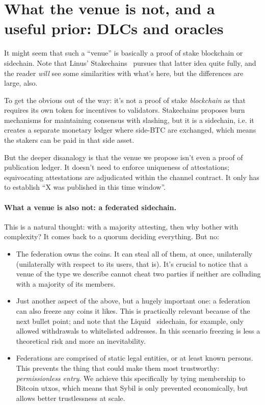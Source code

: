 \documentclass[11pt]{article}
\begin{document}
\section{What the venue is not, and a useful prior: DLCs and oracles}
\label{sec:venue}

It might seem that such a ``venue'' is basically a proof of stake blockchain or sidechain. Note that Linus' Stakechains~\cite{coins} pursues that latter idea quite fully, and the reader \emph{will} see some similarities with what's here, but the differences are large, also.

To get the obvious out of the way: it's not a proof of stake \emph{blockchain} as that requires its own token for incentives to validators. Stakechains proposes burn mechanisms for maintaining consensus with slashing, but it is a sidechain, i.e. it creates a separate monetary ledger where side-BTC are exchanged, which means the stakers can be paid in that side asset.

But the deeper disanalogy is that the venue we propose isn't even a proof of publication ledger. It doesn't need to enforce uniqueness of attestations; equivocating attestations are adjudicated within the channel contract. It only has to establish ``X was published in this time window''.

\paragraph{What a venue is also not: a federated sidechain.} This is a natural thought: with a majority attesting, then why bother with complexity? It comes back to a quorum deciding everything. But no: 

\begin{itemize}
\item The federation owns the coins. It can steal all of them, at once, unilaterally (unilaterally with respect to its users, that is). It's crucial to notice that a venue of the type we describe cannot cheat two parties if neither are colluding with a majority of its members.
\item Just another aspect of the above, but a hugely important one: a federation can also freeze any coins it likes. This is practically relevant because of the next bullet point; and note that the Liquid~\cite{liquid} sidechain, for example, only allowed withdrawals to whitelisted addresses. In this scenario freezing is less a theoretical risk and more an inevitability.
\item Federations are comprised of static legal entities, or at least known persons. This prevents the thing that could make them most trustworthy: \emph{permissionless entry}. We achieve this specifically by tying membership to Bitcoin utxos, which means that Sybil is only prevented economically, but allows better trustlessness at scale.
\end{itemize}
\end{document}
